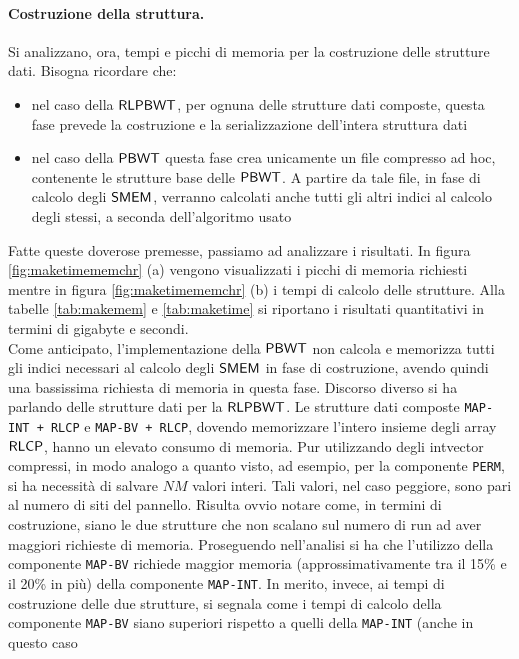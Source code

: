 \paragraph{Costruzione della struttura.}
Si analizzano, ora, tempi e picchi di memoria per la costruzione delle
strutture dati. Bisogna ricordare che:
\begin{itemize}
  \item nel caso della $\mbox{\rm {\sf RLPBWT}}$, per ognuna delle strutture dati
  composte, questa fase prevede la costruzione e la 
  serializzazione dell'intera struttura dati
  \item nel caso della $\mbox{\rm {\sf PBWT}}$ questa fase crea unicamente un file
  compresso ad hoc, contenente le strutture base delle $\mbox{\rm {\sf PBWT}}$. A partire
  da tale file, in fase di calcolo degli $\mbox{\rm {\sf SMEM}}$, verranno calcolati anche
  tutti gli altri indici al calcolo degli stessi, a seconda dell'algoritmo usato
\end{itemize}
Fatte queste doverose premesse, passiamo ad analizzare i risultati.
In figura \ref{fig:maketimememchr} (a) vengono visualizzati i picchi di
memoria richiesti mentre in figura \ref{fig:maketimememchr} (b) i tempi di
calcolo delle strutture. Alla tabelle \ref{tab:makemem} e \ref{tab:maketime} si
riportano i risultati quantitativi in termini di gigabyte e secondi.\\ 
Come anticipato, l'implementazione della $\mbox{\rm {\sf PBWT}}$ non calcola e memorizza
tutti gli indici 
necessari al calcolo degli $\mbox{\rm {\sf SMEM}}$ in fase di costruzione, avendo quindi
una bassissima richiesta di memoria in questa fase. Discorso diverso si ha
parlando delle strutture dati per la $\mbox{\rm {\sf RLPBWT}}$. Le strutture dati composte
\texttt{MAP-INT + RLCP} e \texttt{MAP-BV + RLCP}, dovendo 
memorizzare l'intero insieme degli array $\mbox{\rm {\sf RLCP}}$, hanno un elevato
consumo di memoria. Pur utilizzando degli intvector compressi, in modo
analogo a quanto visto, ad esempio, per la componente \texttt{PERM}, si ha
necessità di salvare $NM$ valori interi. Tali valori, nel caso peggiore, sono
pari al numero di siti del pannello. Risulta ovvio notare come, in
termini di costruzione, siano le due strutture che non scalano sul numero
di run 
ad aver maggiori richieste di memoria. Proseguendo nell'analisi si ha che
l'utilizzo della componente 
\texttt{MAP-BV} richiede maggior memoria (approssimativamente tra
il 15\% e il 20\% in più) della componente
\texttt{MAP-INT}. In merito, invece, ai tempi di costruzione delle due
strutture, si 
segnala come i tempi di calcolo della componente \texttt{MAP-BV} siano superiori
rispetto a quelli della \texttt{MAP-INT} (anche in questo caso
